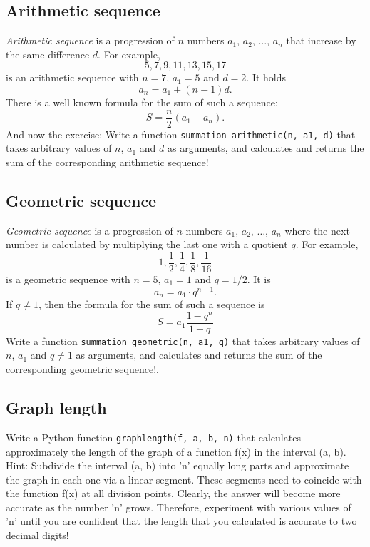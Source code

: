 \subsection{Arithmetic sequence}

{\em Arithmetic sequence} is a progression of $n$ numbers $a_1$, $a_2$, $\ldots$, $a_n$
that increase by the same difference $d$. For example, 
$$
5, 7, 9, 11, 13, 15, 17
$$
is an arithmetic sequence with $n = 7$, $a_1 = 5$ and $d = 2$. It holds
$$
a_n = a_1 + (n-1)d.
$$
There is a well known formula for the sum of such a sequence:
$$
S = \frac{n}{2}(a_1 + a_n).
$$
And now the exercise: Write a function {\tt summation\_arithmetic(n, a1, d)} that takes arbitrary 
values of $n$, $a_1$ and $d$ as arguments, and calculates and returns the sum
of the corresponding arithmetic sequence!


\subsection{Geometric sequence}

{\em Geometric sequence} is a progression of $n$ numbers $a_1$, $a_2$, $\ldots$, $a_n$
where the next number is calculated by multiplying the last one with a quotient $q$.
For example, 
$$
1, \frac{1}{2}, \frac{1}{4}, \frac{1}{8}, \frac{1}{16}
$$
is a geometric sequence with $n = 5$, $a_1 = 1$ and $q = 1/2$. It is 
$$
a_n = a_1 \cdot q^{n-1}.
$$
If $q \not = 1$, then the formula for the sum of such a sequence is
$$
S = a_1\frac{1 - q^n}{1 - q}
$$
Write a function {\tt summation\_geometric(n, a1, q)} that takes arbitrary 
values of $n$, $a_1$ and $q \not = 1$ as arguments, and calculates 
and returns the sum of the corresponding geometric sequence!.


\subsection{Graph length}

Write a Python function {\tt graphlength(f, a, b, n)} that calculates approximately 
the length of the graph of a function f(x) in the interval (a, b). Hint: Subdivide the 
interval (a, b) into 'n' equally long parts and approximate the graph in each one via 
a linear segment. These segments need to coincide with the function f(x) at all division 
points. Clearly, the answer will become more accurate as the number 'n' grows. Therefore, 
experiment with various values of 'n' until you are confident that the length that you 
calculated is accurate to two decimal digits!

